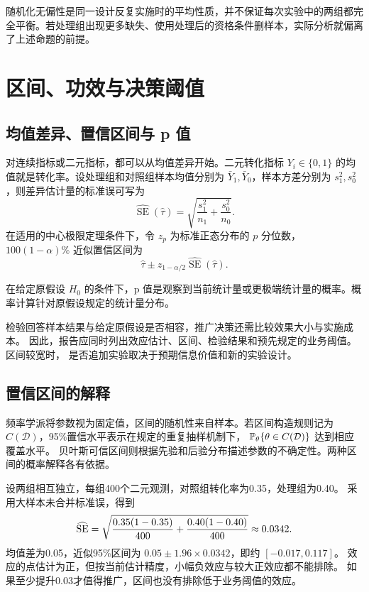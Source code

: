随机化无偏性是同一设计反复实施时的平均性质，并不保证每次实验中的两组都完全平衡。若处理组出现更多缺失、使用处理后的资格条件删样本，实际分析就偏离了上述命题的前提。

\section{区间、功效与决策阈值}
\label{sec:inference-interpretation}
\subsection{均值差异、置信区间与 p 值}

对连续指标或二元指标，都可以从均值差异开始。二元转化指标 \(Y_i\in\{0,1\}\) 的均值就是转化率。设处理组和对照组样本均值分别为 \(\bar Y_1,\bar Y_0\)，样本方差分别为 \(s_1^2,s_0^2\)，则差异估计量的标准误可写为
\[
  \widehat{\operatorname{SE}}(\hat\tau)
  =
  \sqrt{\frac{s_1^2}{n_1}+\frac{s_0^2}{n_0}}.
\]
在适用的中心极限定理条件下，令 \(z_p\) 为标准正态分布的 \(p\) 分位数，
\(100(1-\alpha)\%\) 近似置信区间为
\[
  \hat\tau
  \pm
  z_{1-\alpha/2}\widehat{\operatorname{SE}}(\hat\tau).
\]

\begin{definition}[p 值]
在给定原假设 \(H_0\) 的条件下，p 值是观察到当前统计量或更极端统计量的概率。概率计算针对原假设规定的统计量分布。
\end{definition}

检验回答样本结果与给定原假设是否相容，推广决策还需比较效果大小与实施成本。
因此，报告应同时列出效应估计、区间、检验结果和预先规定的业务阈值。区间较宽时，
是否追加实验取决于预期信息价值和新的实验设计。

\subsection{置信区间的解释}
频率学派将参数视为固定值，区间的随机性来自样本。若区间构造规则记为
\(C(\mathcal D)\)，95\%置信水平表示在规定的重复抽样机制下，
\(\mathbb P_\theta\{\theta\in C(\mathcal D)\}\) 达到相应覆盖水平。
贝叶斯可信区间则根据先验和后验分布描述参数的不确定性。两种区间的概率解释各有依据。

\begin{example}[幅度、精度与经济阈值]
设两组相互独立，每组400个二元观测，对照组转化率为0.35，处理组为0.40。
采用大样本未合并标准误，得到
\[
\widehat{\rm SE}=
\sqrt{\frac{0.35(1-0.35)}{400}+\frac{0.40(1-0.40)}{400}}
\approx0.0342.
\]
均值差为0.05，近似95\%区间为
\(0.05\pm1.96\times0.0342\)，即约 \([-0.017,0.117]\)。
效应的点估计为正，但按当前估计精度，小幅负效应与较大正效应都不能排除。
如果至少提升0.03才值得推广，区间也没有排除低于业务阈值的效应。
\end{example}

